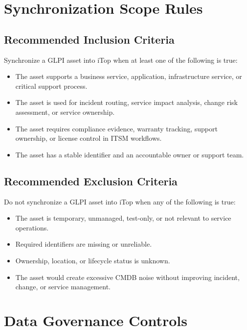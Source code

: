 \documentclass[11pt]{article}
\begin{document}
\section{Synchronization Scope Rules}

\subsection{Recommended Inclusion Criteria}

Synchronize a GLPI asset into iTop when at least one of the following is true:

\begin{itemize}
  \item The asset supports a business service, application, infrastructure service, or critical support process.
  \item The asset is used for incident routing, service impact analysis, change risk assessment, or service ownership.
  \item The asset requires compliance evidence, warranty tracking, support ownership, or license control in ITSM workflows.
  \item The asset has a stable identifier and an accountable owner or support team.
\end{itemize}

\subsection{Recommended Exclusion Criteria}

Do not synchronize a GLPI asset into iTop when any of the following is true:

\begin{itemize}
  \item The asset is temporary, unmanaged, test-only, or not relevant to service operations.
  \item Required identifiers are missing or unreliable.
  \item Ownership, location, or lifecycle status is unknown.
  \item The asset would create excessive CMDB noise without improving incident, change, or service management.
\end{itemize}

\section{Data Governance Controls}
\end{document}
